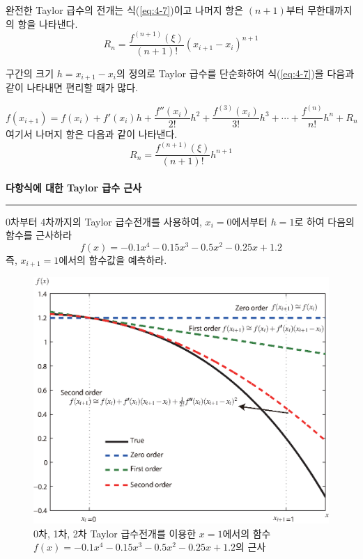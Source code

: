 완전한 Taylor 급수의 전개는 식(\ref{eq:4-7})이고 나머지 항은 $(n+1)$부터 무한대까지의 항을 나타낸다.
\begin{equation}
R_{n}=\frac{f^{(n+1)}(\xi)}{(n+1)!}\left(x_{i+1}-x_{i}\right)^{n+1}
\label{eq:4-8}
\end{equation}

\clearpage
구간의 크기 $h=x_{i+1}-x_{i}$의 정의로 Taylor 급수를 단순화하여 식(\ref{eq:4-7})을 다음과 같이 나타내면 편리할 때가 많다.

\begin{equation}
f(x_{i+1})=f(x_{i})+f'(x_{i})h+\frac{f''(x_{i})}{2!}h^2+\frac{f^{(3)}(x_{i})}{3!}h^3 +\cdots +\frac{f^{(n)}}{n!}h^n+R_{n}
\end{equation}
여기서 나머지 항은 다음과 같이 나타낸다.
\begin{equation}
R_{n}=\frac{f^{(n+1)}(\xi)}{(n+1)!}h^{n+1}
\end{equation}
\\
 \textbf{다항식에 대한 Taylor 급수 근사}\\
\rule{\textwidth}{0.1pt}
0차부터 4차까지의 Taylor 급수전개를 사용하여, $x_{i}=0$에서부터 $h=1$로 하여 다음의 함수를 근사하라
\begin{equation}
f(x)=-0.1x^4-0.15x^3-0.5x^2-0.25x+1.2
\end{equation}
즉, $x_{i+1}=1$에서의 함수값을 예측하라.\\
\begin{figure}[!hbpt]
\centering
\includegraphics[keepaspectratio=true,width=0.8\linewidth]{figs/4-1.eps}
\caption{0차, 1차, 2차 Taylor 급수전개를 이용한 $x=1$에서의 함수 $f(x)=-0.1x^4-0.15x^3-0.5x^2-0.25x+1.2$의 근사}
\label{fig:4-1}
\end{figure}

